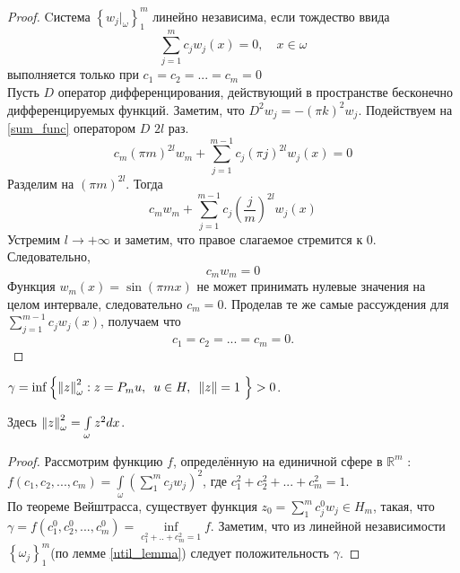 \begin{proof}
Cистема $\left\{ w_j|_{\omega} \right\}^m_1$ линейно независима, если тождество ввида
\begin{equation}\label{sum_func}
	\sum \limits_{j = 1}^m{c_j w_j(x)} = 0, \quad x \in \omega
\end{equation}
выполняется только при $c_1 = c_2 = ... = c_m = 0$\\

Пусть $D$ оператор дифференцирования, действующий в пространстве бесконечно дифференцируемых функций.
Заметим, что $D^2 w_j = -(\pi k)^2 w_j$. Подействуем  на \eqref{sum_func} оператором $D$ $2l$ раз.
\begin{equation*}
	c_m (\pi m)^{2l} w_m + \sum \limits_{j = 1}^{m - 1}{c_j (\pi j)^{2l} w_j(x)} = 0
\end{equation*}
Разделим на $(\pi m)^{2l}$. Тогда
\begin{equation*}
	c_m w_m + \sum \limits_{j = 1}^{m - 1}{c_j \left(\frac{j}{m}\right)^{2l} w_j(x)}
\end{equation*}
Устремим $l \rightarrow +\infty$ и заметим, что правое слагаемое стремится к 0.\\ 
Следовательно,
\begin{equation*}
	c_m w_m = 0
\end{equation*}
Функция $w_m(x) = \sin{(\pi m x)}$ не может принимать нулевые значения на целом интервале, следовательно $c_m = 0$. Проделав те же самые рассуждения для $\sum \limits_{j = 1}^{m - 1}{c_j w_j(x)}$, получаем что 
\begin{equation*}
	c_1 = c_2 = ... = c_m = 0.
\end{equation*}
\end{proof}
\par
\vspace{2ex}
\begin{lemma}\label{main_lemma}
$\gamma = \inf{ \left\{ \left\lVert z\right\rVert^2_{\omega} : z = P_mu,\enskip u \in H, \enskip \left\lVert z\right\rVert = 1 \ \right\} } > 0$.\\
\par Здесь $\left\lVert z\right\rVert^2_{\omega} = \int\limits_{\omega}{z^2dx}$.
\end{lemma}
\begin{proof}
Рассмотрим функцию $f$, определённую на единичной сфере в $\mathbb{R}^m$ :\\
$f(c_1, c_2, ..., c_m) = \int \limits_{\omega} {(\sum\limits_1^m {c_j w_j})^2}$, где $c_1^2 + c_2^2 + ... + c^2_m = 1$.\\
По теореме Вейштрасса, существует функция $z_0 = \sum\limits_1^m {c_j^0 w_j} \in H_m$, такая, что \\
$\gamma = f(c_1^0, c_2^0, ..., c_m^0) = \inf \limits_{c_1^2 + .. + c_m^2 = 1} {f}$. Заметим, что из линейной независимости $\left\{ \omega_j \right\}^m_1$(по лемме \ref{util_lemma}) следует положительность $\gamma$.
\end{proof}
